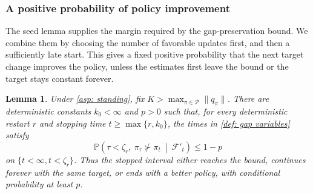 \documentclass[twoside,11pt]{article}
\newtheorem{lemma}[lemma]{Lemma}
\DeclareRobustCommand{\reviewbarstart}{%
  \ifhmode %
    \vadjust{\vbox to 0pt{%
      \vskip-\ht\strutbox %
      \vskip-\dp\strutbox %
      \cbstart[\changebarwidth] %
      \vss %
    }}%
  \else %
    \cbstart[\changebarwidth]%
  \fi %
} %
\providecommand{\DIFadd}[1]{#1} %
\providecommand{\DIFaddbegin}{\reviewbarstart} %
\providecommand{\DIFaddend}{\protect\cbend} %
\def\DIFadd#1{#1}%
\def\DIFaddbegin{}%
\def\DIFaddend{}%
\begin{document}
 \DIFaddbegin \subsubsection{\DIFadd{A positive probability of policy improvement}}
\DIFadd{The seed lemma supplies the margin required by the gap-preservation bound. We combine them by choosing the number of favorable updates first, and then a sufficiently late start. This gives a fixed positive probability that the next target change improves the policy, unless the estimates first leave the bound or the target stays constant forever.
}\DIFaddend 

 \DIFaddbegin \begin{lemma}
\label{thm: fixed prob that bad actions dont become greedy}
\DIFadd{Under \autoref{asp: standing}, fix $K>\max_{\pi\in\mathcal P}\|q_\pi\|$. There are deterministic constants $k_0<\infty$ }\DIFaddend and  \DIFaddbegin \DIFadd{$p>0$ such that, for every deterministic restart $r$ and stopping time $t\ge\max\{r,k_0\}$, the times in \autoref{def: gap variables} satisfy
}\begin{equation}
\DIFadd{\label{eq:progress}
\mathbb P\!\left(\tau<\zeta_r,\ \pi_\tau\not\succ\pi_t
\ \middle|\ \mathcal F'_t\right)\le1-p
}\end{equation}
\DIFadd{on $\{t<\infty,t<\zeta_r\}$. Thus the stopped interval either reaches the bound, continues forever with the same target, or ends with a better policy, with conditional probability at least $p$}\DIFaddend .
 \DIFaddbegin \end{lemma}
\end{document}
